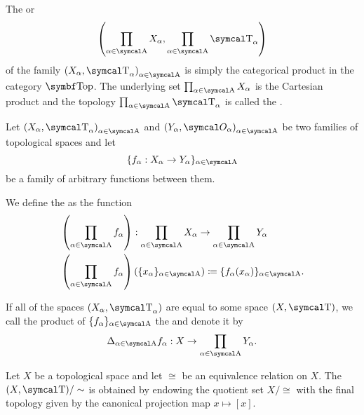 \begin{definition}\label{def:topological_product}
  The  or  
  \begin{equation*}
    \left( \prod_{\al \in \CA} X_\al, \prod_{\al \in \CA} \CT_\al \right)
  \end{equation*}
  of the family \( { (X_\al, \CT_\al) }_{\al \in \CA} \) is simply the categorical product in the category \( \Cat{Top} \). The underlying set \( \prod_{\al \in \CA} X_\al \) is the Cartesian product and the topology \( \prod_{\al \in \CA} \CT_\al \) is called the .

  Let \( { (X_\al, \CT_\al) }_{\al \in \CA} \) and \( { (Y_\al, \Cal{O}_\al) }_{\al \in \CA} \) be two families of topological spaces and let
  \begin{equation*}
    \{ f_\al: X_\al \to Y_\al \}_{\al \in \CA}
  \end{equation*}
  be a family of arbitrary functions between them.

  We define the  as the function
  \begin{align*}
    &\left(\prod_{\al \in \CA} f_\al \right): \prod_{\al \in \CA} X_\al \to \prod_{\al \in \CA} Y_\al \\
    &\left(\prod_{\al \in \CA} f_\al \right)(\{ x_\al \}_{\al \in \CA}) \coloneqq \{ f_\al (x_\al) \}_{\al \in \CA}.
  \end{align*}

  If all of the spaces \( (X_\al, \CT_\al) \) are equal to some space \( (X, \CT) \), we call the product of \( \{ f_\al \}_{\al \in \CA} \) the  and denote it by
  \begin{equation*}
    \Delta_{\al \in \CA} f_\al: X \to \prod_{\al \in \CA} Y_\al.
  \end{equation*}
\end{definition}

\begin{definition}\label{def:topological_quotient}\cite[90]{Engelking1989}
  Let \( X \) be a topological space and let \( \cong \) be an equivalence relation on \( X \). The  \( (X, \CT) / \sim \) is obtained by endowing the quotient set \( X / \cong \) with the final topology given by the canonical projection map \( x \mapsto [x] \).
\end{definition}

